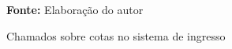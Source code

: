 \begin{figure}[ht!]
\centering

\caption{\textmd{Chamados sobre cotas no sistema de ingresso}}
\label{fig:chamados}
\par\medskip\textbf{Fonte:} Elaboração do autor \par\medskip

\end{figure}

